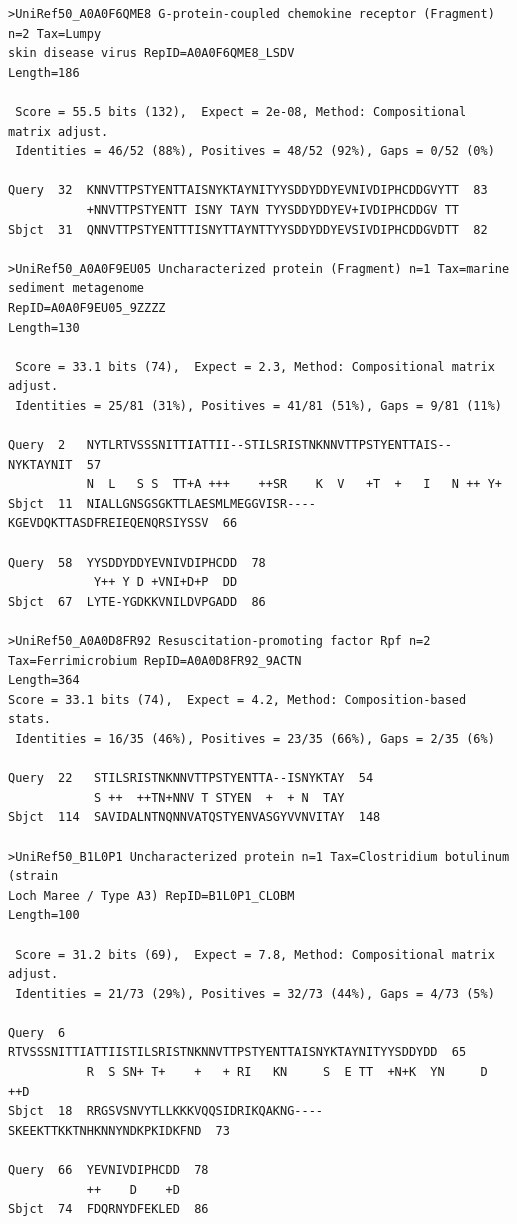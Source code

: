 \documentclass{article}
\begin{document}
\begin{itemize}
\begin{verbatim}
>UniRef50_A0A0F6QME8 G-protein-coupled chemokine receptor (Fragment) n=2 Tax=Lumpy
skin disease virus RepID=A0A0F6QME8_LSDV
Length=186

 Score = 55.5 bits (132),  Expect = 2e-08, Method: Compositional matrix adjust.
 Identities = 46/52 (88%), Positives = 48/52 (92%), Gaps = 0/52 (0%)

Query  32  KNNVTTPSTYENTTAISNYKTAYNITYYSDDYDDYEVNIVDIPHCDDGVYTT  83
           +NNVTTPSTYENTT ISNY TAYN TYYSDDYDDYEV+IVDIPHCDDGV TT
Sbjct  31  QNNVTTPSTYENTTTISNYTTAYNTTYYSDDYDDYEVSIVDIPHCDDGVDTT  82

>UniRef50_A0A0F9EU05 Uncharacterized protein (Fragment) n=1 Tax=marine sediment metagenome
RepID=A0A0F9EU05_9ZZZZ
Length=130

 Score = 33.1 bits (74),  Expect = 2.3, Method: Compositional matrix adjust.
 Identities = 25/81 (31%), Positives = 41/81 (51%), Gaps = 9/81 (11%)

Query  2   NYTLRTVSSSNITTIATTII--STILSRISTNKNNVTTPSTYENTTAIS--NYKTAYNIT  57
           N  L   S S  TT+A +++    ++SR    K  V   +T  +   I   N ++ Y+
Sbjct  11  NIALLGNSGSGKTTLAESMLMEGGVISR----KGEVDQKTTASDFREIEQENQRSIYSSV  66

Query  58  YYSDDYDDYEVNIVDIPHCDD  78
            Y++ Y D +VNI+D+P  DD
Sbjct  67  LYTE-YGDKKVNILDVPGADD  86

>UniRef50_A0A0D8FR92 Resuscitation-promoting factor Rpf n=2 Tax=Ferrimicrobium RepID=A0A0D8FR92_9ACTN
Length=364
Score = 33.1 bits (74),  Expect = 4.2, Method: Composition-based stats.
 Identities = 16/35 (46%), Positives = 23/35 (66%), Gaps = 2/35 (6%)

Query  22   STILSRISTNKNNVTTPSTYENTTA--ISNYKTAY  54
            S ++  ++TN+NNV T STYEN  +  + N  TAY
Sbjct  114  SAVIDALNTNQNNVATQSTYENVASGYVVNVITAY  148

>UniRef50_B1L0P1 Uncharacterized protein n=1 Tax=Clostridium botulinum (strain
Loch Maree / Type A3) RepID=B1L0P1_CLOBM
Length=100

 Score = 31.2 bits (69),  Expect = 7.8, Method: Compositional matrix adjust.
 Identities = 21/73 (29%), Positives = 32/73 (44%), Gaps = 4/73 (5%)

Query  6   RTVSSSNITTIATTIISTILSRISTNKNNVTTPSTYENTTAISNYKTAYNITYYSDDYDD  65
           R  S SN+ T+    +   + RI   KN     S  E TT  +N+K  YN     D ++D
Sbjct  18  RRGSVSNVYTLLKKKVQQSIDRIKQAKNG----SKEEKTTKKTNHKNNYNDKPKIDKFND  73

Query  66  YEVNIVDIPHCDD  78
           ++    D    +D
Sbjct  74  FDQRNYDFEKLED  86


\end{verbatim}
\end{itemize}
\end{document}
